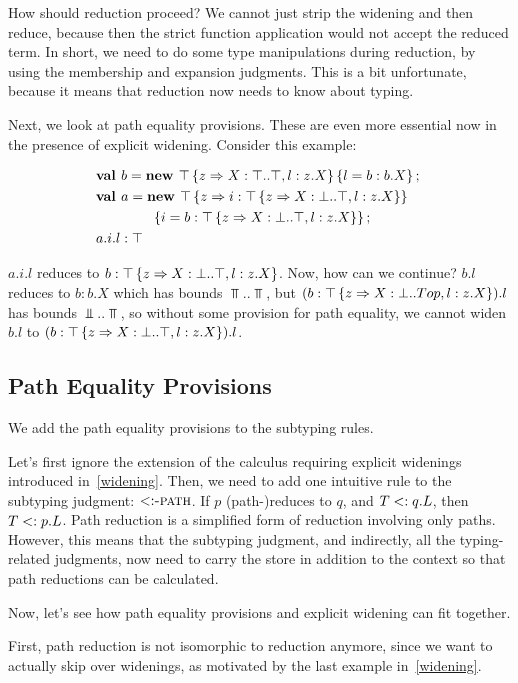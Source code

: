 \documentclass[preprint]{sigplanconf}
\begin{document}
How should reduction proceed? We cannot just strip the widening and
then reduce, because then the strict function application would not
accept the reduced term. In short, we need to do some type
manipulations during reduction, by using the membership and expansion
judgments. This is a bit unfortunate, because it means that reduction
now needs to know about typing.

Next, we look at path equality provisions. These are even more
essential now in the presence of explicit widening. Consider this
example:

\begin{align*}
&\mlnew b {\Top \refine z {\Ldecl X \Top \Top, \ldecl l {z.X}} \ldefs{l = \wid b {b.X}}}{
\mlnew a {\Top \refine z {\ldecl i {\Top \refine z {\Ldecl X \Bot \Top, \ldecl l {z.X}}}}\\
&\gap\gap\ldefs{i = \wid b {\Top \refine z {\Ldecl X \Bot \Top, \ldecl l {z.X}}}}}}{
\wid {a.i.l} \Top
}
\end{align*}

$a.i.l$ reduces to $b : \top \left\{z \Rightarrow X : \bot..\top, l : z.X \right\}$. Now, how can we continue? $b.l$ reduces to $b : b.X$
which has bounds $\Top..\Top$, but $(b : \top \left\{z \Rightarrow X : \bot..Top, l : z.X \right\}).l$ has bounds $\Bot..\Top$, so without
some provision for path equality, we cannot widen $b.l$ to $(b : \top \left\{z \Rightarrow X : \bot..\top, l : z.X \right\}).l$.

\subsection{Path Equality Provisions}

We add the path equality provisions to the subtyping rules.

Let's first ignore the extension of the calculus requiring explicit
widenings introduced in~\ref{widening}. Then, we need to add one
intuitive rule to the subtyping judgment: $\textsc{$<:$-path}$. If
$p$ (path-)reduces to $q$, and $T <: q.L$, then $T <: p.L$. Path
reduction is a simplified form of reduction involving only
paths. However, this means that the subtyping judgment, and
indirectly, all the typing-related judgments, now need to carry the
store in addition to the context so that path reductions can be
calculated.

Now, let's see how path equality provisions and explicit widening can
fit together.

First, path reduction is not isomorphic to reduction anymore, since we
want to actually skip over widenings, as motivated by the last example
in~\ref{widening}.
\end{document}
